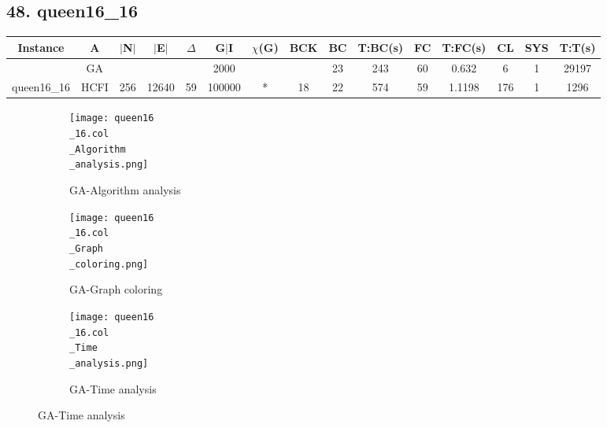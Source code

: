 \documentclass[10pt]{article}
\begin{document}
\subsection*{\hspace{0,9073976cm} 48. queen16\_16}
\begin{table}[H]
\centering
\begin{tabular}{|c|c|c|c|c|c|c|c|c|c|c|c|c|c|c|}
\hline
Instance& A &$|$N$|$ & $|$E$|$ & $\Delta$ & G$|$I & $\chi$(G) &BCK&BC & T:BC(s) & FC & T:FC(s) & CL & SYS & T:T(s) \\ \hline \hline
	&GA&       &                   &                     &  2000       &     \cellcolor{yellow} & {\cellcolor{yellow}}& {{\cellcolor{green}23}}
&243   &60        &0.632                   &6                    &1          &29197        \\ \cline{2-2} \cline{6-6} \cline{9-15}
 \multirow{-2}{*}{queen16\_16} &HCFI   &\multirow{-2}{*}{256}   &\multirow{-2}{*}{12640}     &\multirow{-2}{*}{59}     &100000     &\multirow{-2}{*}{\cellcolor{yellow}*}      & \multirow{-2}{*}{\cellcolor{yellow}18}    &{\cellcolor{green}22}     &574         &59    &1.1198         &176    &1     &1296        \\ \hline 
\end{tabular}
\end{table}
\graphicspath{{./Core1/Solutions/GA/queen16\_16.col}}
\begin{figure}[H]
\begin{subfigure}{.33\textwidth}
  \centering
  \texttt{[image: queen16\\\_16.col\\\_Algorithm\\\_analysis.png]}
  \caption{GA-Algorithm analysis}
   \label{fig:subfig1}
\end{subfigure}%
\begin{subfigure}{.33\textwidth}
  \centering
  \texttt{[image: queen16\\\_16.col\\\_Graph\\\_coloring.png]}
  \caption{GA-Graph coloring}
  \label{fig:subfig2}
\end{subfigure}
\begin{subfigure}{.33\textwidth}
  \centering
  \texttt{[image: queen16\\\_16.col\\\_Time\\\_analysis.png]}
  \caption{GA-Time analysis}
  \end{subfigure}
\end{figure}
\end{document}
